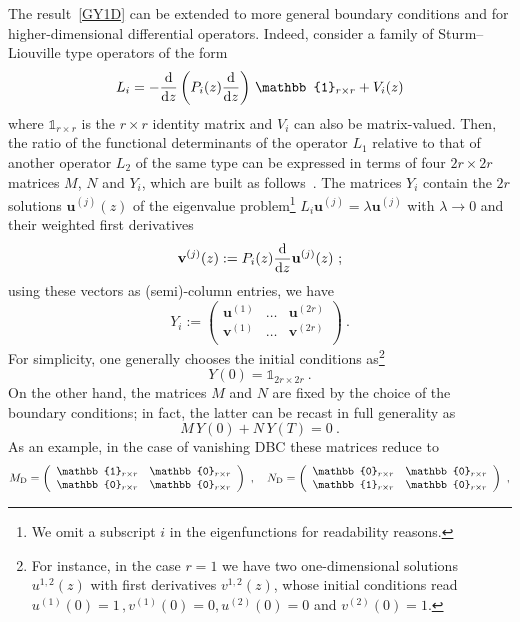 \documentclass[12pt,a4paper]{article}
\numberwithin{equation}{section}
\numberwithin{equation}{section}
\begin{document}
The result~\eqref{GY1D} can be extended to more general boundary conditions and for higher-dimensional differential operators. Indeed, consider a family of Sturm--Liouville type operators of the form
\begin{equation} \label{L1}
L_i=-\frac{{\rm d}}{{\rm d}z}\left(P_i(z)\frac{{\rm d}}{{\rm d}z}\right) \, \mathbb{1}_{r \times r} +V_i(z)
\end{equation}
where $\mathbb{1}_{r \times r}$ is the $r \times r$ identity matrix and $V_i$ can also be matrix-valued. Then, the ratio of the functional determinants of the operator $L_1$ relative to that of another operator $L_2$ of the same type can be expressed in terms of four $2r \times 2r$ matrices $M$, $N$ and $Y_i$, which are built as follows~\cite{Kirsten:2004qv}.
The matrices $Y_i$ contain the $2r$ solutions $\mathbf{u}^{(j)}(z)$ of the eigenvalue problem\footnote{We omit a subscript $i$ in the eigenfunctions for readability reasons.} $L_i \mathbf{u}^{(j)}=\lambda \mathbf{u}^{(j)}$ with $\lambda\to 0$ and their weighted first derivatives 
\begin{align}\label{eq:weighted_derivatives}
 \mathbf{v}^{(j)}(z):=P_i(z)\frac{{\rm d}}{{\rm d}z}\mathbf{u}^{(j)}(z)\ ;
\end{align}
using these vectors as (semi)-column entries, we have 
\begin{equation}
Y_i:=\left(
\begin{array}{ccc} \mathbf{u}^{(1)} & \dots & \mathbf{u}^{(2r)} \\ \mathbf{v}^{(1)} & \dots & \mathbf{v}^{(2r)} \\
\end{array}\right)\ .
\end{equation}
For simplicity, one generally chooses the initial conditions as\footnote{For instance, in the case $r=1$ we have two one-dimensional solutions $u^{1,2}(z)$ with first derivatives $v^{1,2}(z)$, whose initial conditions read $u^{(1)}(0)=1 \, , v^{(1)}(0)=0, u^{(2)}(0)=0$ and $v^{(2)}(0)=1$.}
\begin{equation} \label{BCY}
Y(0)=\mathbb{1}_{2r \times 2r}\ . 
\end{equation}
On the other hand, the matrices $M$ and $N$ are fixed by the choice of the boundary conditions; in fact, the latter can be recast in full generality as
\begin{equation}
M \, Y(0)+ N \, Y(T)=0\ .
\end{equation}
As an example, in the case of vanishing DBC these matrices reduce to
\begin{equation}
M_{\rm D}=\left(
\begin{array}{cc} \mathbb{1}_{r \times r} & \mathbb{0}_{r \times r} \\ \mathbb{0}_{r \times r} & \mathbb{0}_{r \times r} \\
\end{array}\right)\ , \quad 
N_{\rm D}=\left(
\begin{array}{cc} \mathbb{0}_{r \times r} & \mathbb{0}_{r \times r} \\ \mathbb{1}_{r \times r} & \mathbb{0}_{r \times r} \\
\end{array}\right)\ ,
\end{equation}
\end{document}
